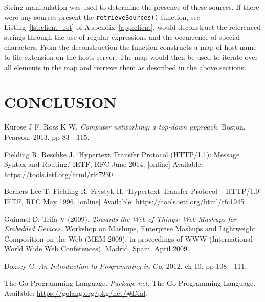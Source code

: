 \documentclass[10pt,twocolumn]{witseiepaper}
\begin{document}
		String manipulation was used to determine the presence of these sources. If there were any sources present the \texttt{retrieveSources()} function, see Listing~\ref{lst:client_ret} of Appendix~\ref{app:client}, would deconstruct the referenced strings through the use of regular expressions and the occurrence of special characters. From the deconstruction the function constructs a map of host name to file extension on the hosts server. The map would then be used to iterate over all elements in the map and retrieve them as described in the above sections.
				
			
	
% 


\section{CONCLUSION}


\begin{thebibliography}{1}

 Kurose J F, Ross K W. \emph{Computer networking: a top-down approach.} Boston, Pearson. 2013. pp 83 - 115.

 Fielding R, Reschke J. `Hypertext Transfer Protocol (HTTP/1.1): Message Syntax and Routing.' IETF, RFC June 2014. [online] Available: \url{https://tools.ietf.org/html/rfc7230}

 Berners-Lee T, Fielding R, Frystyk H. `Hypertext Transfer Protocol -- HTTP/1.0' IETF, RFC May 1996. [online] Available: \url{https://tools.ietf.org/html/rfc1945}

   Guinard D, Trifa V (2009). \emph{Towards the Web of Things: Web Mashups for Embedded Devices.} Workshop on Mashups, Enterprise Mashups and Lightweight Composition on the Web (MEM 2009), in proceedings of WWW (International World Wide Web Conferences). Madrid, Spain. April 2009.  

 Doxsey C. \emph{An Introduction to Programming in Go.} 2012. ch 10. pp 108 - 111.

 The Go Programming Language. \emph{Package net.} The Go Programming Language. Available: \url{https://golang.org/pkg/net/#Dial}.


\end{thebibliography}
\end{document}

